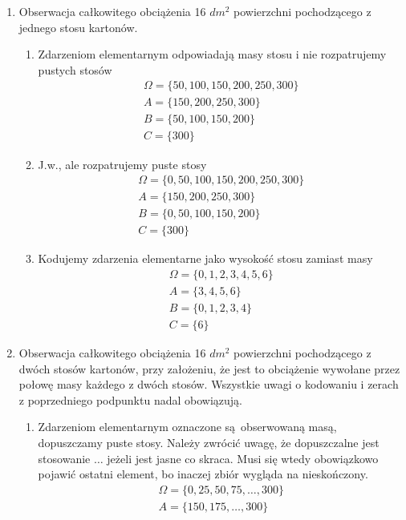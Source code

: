 \documentclass[twoside]{mwart}
\begin{document}
\begin{enumerate}
{	\begin{enumerate}
		\item Obserwacja całkowitego obciążenia 16 $dm^2$ powierzchni pochodzącego z jednego stosu kartonów.
		\begin{enumerate}
			\item Zdarzeniom elementarnym odpowiadają masy stosu i nie rozpatrujemy pustych stosów
			\begin{gather*}
				\Omega=\{50, 100, 150, 200, 250, 300\} \\
				A = \{150, 200, 250, 300\} \\
				B = \{50, 100, 150, 200\} \\
				C = \{300\}
			\end{gather*}
			\item J.w., ale rozpatrujemy puste stosy
			\begin{gather*}
				\Omega=\{0, 50, 100, 150, 200, 250, 300\} \\
				A = \{150, 200, 250, 300\} \\
				B = \{0, 50, 100, 150, 200\} \\
				C = \{300\}
			\end{gather*}
			\item Kodujemy zdarzenia elementarne jako wysokość stosu zamiast masy
			\begin{gather*}
			\Omega=\{0, 1, 2, 3, 4, 5, 6\} \\
			A = \{3, 4, 5, 6\} \\
			B = \{0, 1, 2, 3, 4\} \\
			C = \{6\}
			\end{gather*}
		\end{enumerate}
		\item Obserwacja całkowitego obciążenia 16 $dm^2$ powierzchni pochodzącego z dwóch stosów kartonów, przy założeniu, że jest to obciążenie wywołane przez połowę masy każdego z dwóch stosów. Wszystkie uwagi o kodowaniu i zerach z poprzedniego podpunktu nadal obowiązują.
		\begin{enumerate}
			\item Zdarzeniom elementarnym oznaczone są obserwowaną masą, dopuszczamy puste stosy. Należy zwrócić uwagę, że dopuszczalne jest stosowanie $\ldots$ jeżeli jest jasne co skraca. Musi się wtedy obowiązkowo pojawić ostatni element, bo inaczej zbiór wygląda na nieskończony.
			\begin{gather*}
			\Omega=\{0, 25, 50, 75, \ldots, 300\} \\
			A = \{150, 175, \ldots, 300\} \\

\end{gather*}
\end{enumerate}
\end{enumerate}}
\end{enumerate}
\end{document}
